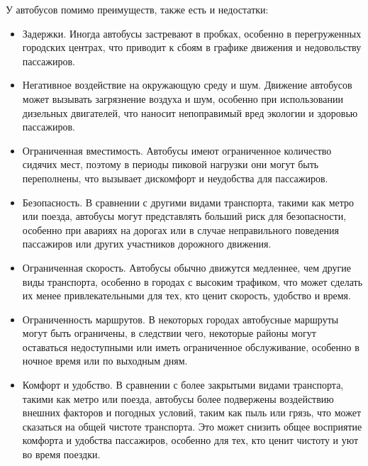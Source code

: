 У автобусов помимо преимуществ, также есть и недостатки:
\begin{itemize}
	\item Задержки. Иногда автобусы застревают в пробках, особенно в перегруженных городских центрах, что приводит к сбоям в графике движения и недовольству пассажиров.
	\item Негативное воздействие на окружающую среду и шум. Движение автобусов может вызывать загрязнение воздуха и шум, особенно при использовании дизельных двигателей, что наносит непоправимый вред экологии и здоровью пассажиров.
	\item Ограниченная вместимость. Автобусы имеют ограниченное количество сидячих мест, поэтому в периоды пиковой нагрузки они могут быть переполнены, что вызывает дискомфорт и неудобства для пассажиров.
	\item Безопасность. В сравнении с другими видами транспорта, такими как метро или поезда, автобусы могут представлять больший риск для безопасности, особенно при авариях на дорогах или в случае неправильного поведения пассажиров или других участников дорожного движения.
	\item Ограниченная скорость. Автобусы обычно движутся медленнее, чем другие виды транспорта, особенно в городах с высоким трафиком, что может сделать их менее привлекательными для тех, кто ценит скорость, удобство и время.
	\item Ограниченность маршрутов. В некоторых городах автобусные маршруты могут быть ограничены, в следствии чего, некоторые районы могут оставаться недоступными или иметь ограниченное обслуживание, особенно в ночное время или по выходным дням.
	\item Комфорт и удобство. В сравнении с более закрытыми видами транспорта, такими как метро или поезда, автобусы более подвержены воздействию внешних факторов и погодных условий, таким как пыль или грязь, что может сказаться на общей чистоте транспорта. Это может снизить общее восприятие комфорта и удобства пассажиров, особенно для тех, кто ценит чистоту и уют во время поездки.
\end{itemize}

